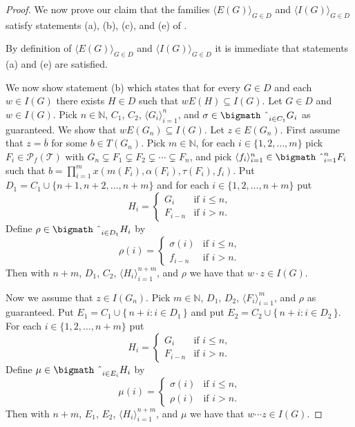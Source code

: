 \documentclass[12pt,showtrims]{memoir}
\theoremstyle{plain}
\theoremstyle{definition}
\newcommand{\la}{\langle}
\newcommand{\ra}{\rangle}
\newcommand{\bbN}{\mathbb{N}}
\newcommand{\calT}{\mathcal{T}}
\newcommand{\Pf}{\mathcal{P}_f}
\newcommand{\bigtimes}{\hbox{\bigmath \char'2}}
\begin{document}
\begin{proof}
  We now prove our claim that the families $\la E(G) \ra_{G \in D}$ and $\la I(G) \ra_{G \in D}$ satisfy statements (a), (b), (c), and (e) of \cite[Lemma 14.9]{Hindman:1998fk}.

  By definition of $\la E(G) \ra_{G \in D}$ and $\la I(G) \ra_{G \in D}$ it is immediate that statements (a) and (e) are satisfied. 

  We now show statement (b) which states that for every $G \in D$ and each $w \in I(G)$ there exists $H \in D$ such that $w E(H) \subseteq I(G)$.
  Let $G \in D$ and $w \in I(G)$. 
  Pick $n \in \bbN$, $C_1$, $C_2$, $\la G_i \ra_{i=1}^n$, and $\sigma \in \bigtimes_{i \in C_1} G_i$ as guaranteed.
  We show that $w E(G_n) \subseteq I(G)$. 
  Let $z \in E(G_n)$. 
  First assume that $z = \overline{b}$ for some $b \in T(G_n)$. 
  Pick $m \in \bbN$, for each $i \in \{1, 2, \ldots, m\}$ pick $F_i \in \Pf(\calT)$ with $G_n \subsetneq F_1 \subsetneq F_2 \subsetneq \cdots \subsetneq F_n$, and pick $\la f_i \ra_{i=1}^n \in \bigtimes_{i=1}^n F_i$ such that $b = \prod_{i=1}^m x(m(F_i), \alpha(F_i), \tau(F_i), f_i)$. 
  Put $D_1 = C_1 \cup \{n+1, n+2, \ldots, n+m\}$ and for each $i \in \{1, 2, \ldots, n+m\}$ put 
  \[
    H_i = 
    \begin{cases}
      G_i & \mbox{if $i \le n$,} \\
      F_{i-n} & \mbox{if $i > n$.}
    \end{cases}
  \]
  Define $\rho \in \bigtimes_{i \in D_1} H_i$ by 
  \[
    \rho(i) =
    \begin{cases}
      \sigma(i) & \mbox{if $i \le n$,} \\
      f_{i-n} & \mbox{if $i > n$.}
    \end{cases}
  \]
  Then with $n+m$, $D_1$, $C_2$, $\la H_i \ra_{i=1}^{n+m}$, and $\rho$ we have that $w \cdot z \in I(G)$. 

  Now we assume that $z \in I(G_n)$. 
  Pick $m \in \bbN$, $D_1$, $D_2$, $\la F_i \ra_{i=1}^m$, and $\rho$ as guaranteed. 
  Put $E_1 = C_1 \cup \{\,n + i : i \in D_1 \,\}$ and put $E_2 = C_2 \cup \{\, n + i : i \in D_2 \,\}$.
  For each $i \in \{1, 2, \ldots, n+m\}$ put
  \[
    H_i = 
    \begin{cases}
      G_i & \mbox{if $i \le n$,} \\
      F_{i-n} & \mbox{if $i > n$.}
    \end{cases}
  \]
  Define $\mu \in \bigtimes_{i \in E_i} H_i$ by
  \[
    \mu(i) = 
    \begin{cases}
      \sigma(i) & \mbox{if $i \le n$,} \\
      \rho(i) & \mbox{if $i > n$.}
    \end{cases}
  \]
  Then with $n+m$, $E_1$, $E_2$, $\la H_i \ra_{i=1}^{n+m}$, and $\mu$ we have that $w \cdots z \in I(G)$.


\end{proof}
\end{document}
